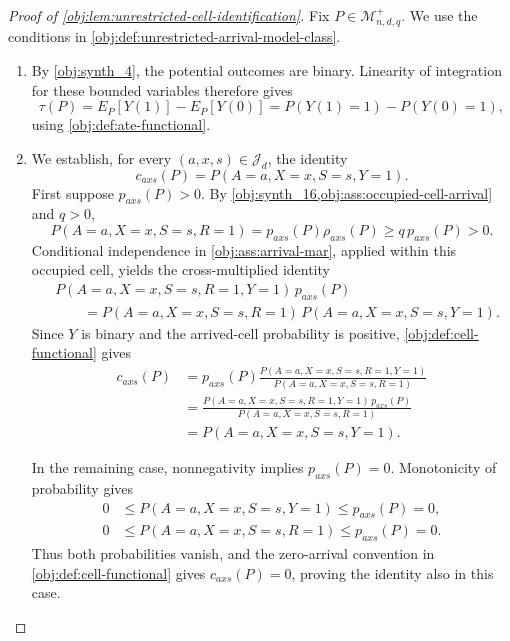 \documentclass[11pt]{article}
\begin{document}
\begin{proof}[Proof of \cref{obj:lem:unrestricted-cell-identification}]
Fix \(P\in\mathcal M^{+}_{n,d,q}\). We use the conditions in \cref{obj:def:unrestricted-arrival-model-class}.

\begin{enumerate}
\item By \cref{obj:synth_4}, the potential outcomes are binary. Linearity of integration for these bounded variables therefore gives
\[
\tau(P)
=E_P[Y(1)]-E_P[Y(0)]
=P(Y(1)=1)-P(Y(0)=1),
\]
using \cref{obj:def:ate-functional}. %

\item We establish, for every \((a,x,s)\in\mathcal J_d\), the identity
\[
c_{axs}(P)=P(A=a,X=x,S=s,Y=1).
\]
First suppose \(p_{axs}(P)>0\). By \cref{obj:synth_16,obj:ass:occupied-cell-arrival} and \(q>0\),
\[
P(A=a,X=x,S=s,R=1)
=p_{axs}(P)\rho_{axs}(P)
\ge q\,p_{axs}(P)>0.
\]
Conditional independence in \cref{obj:ass:arrival-mar}, applied within this occupied cell, yields the cross-multiplied identity
\[
\begin{aligned}
&P(A=a,X=x,S=s,R=1,Y=1)\,p_{axs}(P)\\
&\qquad =
P(A=a,X=x,S=s,R=1)\,
P(A=a,X=x,S=s,Y=1).
\end{aligned}
\]
Since \(Y\) is binary and the arrived-cell probability is positive, \cref{obj:def:cell-functional} gives
\[
\begin{aligned}
c_{axs}(P)
&=p_{axs}(P)
\frac{P(A=a,X=x,S=s,R=1,Y=1)}
     {P(A=a,X=x,S=s,R=1)}\\
&=\frac{P(A=a,X=x,S=s,R=1,Y=1)\,p_{axs}(P)}
        {P(A=a,X=x,S=s,R=1)}\\
&=P(A=a,X=x,S=s,Y=1).
\end{aligned}
\]

In the remaining case, nonnegativity implies \(p_{axs}(P)=0\). Monotonicity of probability gives
\[
\begin{aligned}
0&\le P(A=a,X=x,S=s,Y=1)\le p_{axs}(P)=0,\\
0&\le P(A=a,X=x,S=s,R=1)\le p_{axs}(P)=0.
\end{aligned}
\]
Thus both probabilities vanish, and the zero-arrival convention in
\cref{obj:def:cell-functional} gives \(c_{axs}(P)=0\), proving the identity also in this case. %


\end{enumerate}
\end{proof}
\end{document}
